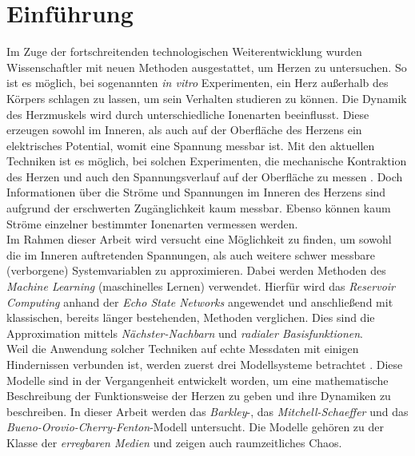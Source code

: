 \chapter{Einführung}
Im Zuge der fortschreitenden technologischen Weiterentwicklung wurden Wissenschaftler mit neuen Methoden ausgestattet, um Herzen zu untersuchen. So ist es möglich, bei sogenannten \textit{in vitro} Experimenten, ein Herz außerhalb des Körpers schlagen zu lassen, um sein Verhalten studieren zu können. Die Dynamik des Herzmuskels wird durch unterschiedliche Ionenarten beeinflusst. Diese erzeugen sowohl im Inneren, als auch auf der Oberfläche des Herzens ein elektrisches Potential, womit eine Spannung messbar ist. Mit den aktuellen Techniken ist es möglich, bei solchen Experimenten, die mechanische Kontraktion des Herzen und auch den Spannungsverlauf auf der Oberfläche zu messen \citep{berdondini2005high, grynkiewicz1985new, ramanathan2004noninvasive}. Doch Informationen über die Ströme und Spannungen im Inneren des Herzens sind aufgrund der erschwerten Zugänglichkeit kaum messbar. Ebenso können kaum Ströme einzelner bestimmter Ionenarten vermessen werden. \\

Im Rahmen dieser Arbeit wird versucht eine Möglichkeit zu finden, um sowohl die im Inneren auftretenden Spannungen, als auch weitere schwer messbare (verborgene) Systemvariablen zu approximieren. Dabei werden Methoden des \textit{Machine Learning} (maschinelles Lernen) verwendet. Hierfür wird das \textit{Reservoir Computing} anhand der \textit{Echo State Networks} angewendet und anschließend mit klassischen, bereits länger bestehenden, Methoden verglichen. Dies sind die Approximation mittels \textit{Nächster-Nachbarn} und \textit{radialer Basisfunktionen}.\\
  
Weil die Anwendung solcher Techniken auf echte Messdaten mit einigen Hindernissen verbunden ist, werden zuerst drei Modellsysteme betrachtet \citep{Barkley:2008, mitchell2003two, Bueno-Orovio2008}. Diese Modelle sind in der Vergangenheit entwickelt worden, um eine mathematische Beschreibung der Funktionsweise der Herzen zu geben und ihre Dynamiken zu beschreiben. In dieser Arbeit werden das \textit{Barkley}-, das \textit{Mitchell-Schaeffer} und das \textit{Bueno-Orovio-Cherry-Fenton}-Modell untersucht. Die Modelle gehören zu der Klasse der \textit{erregbaren Medien} und zeigen auch raumzeitliches Chaos.\\

